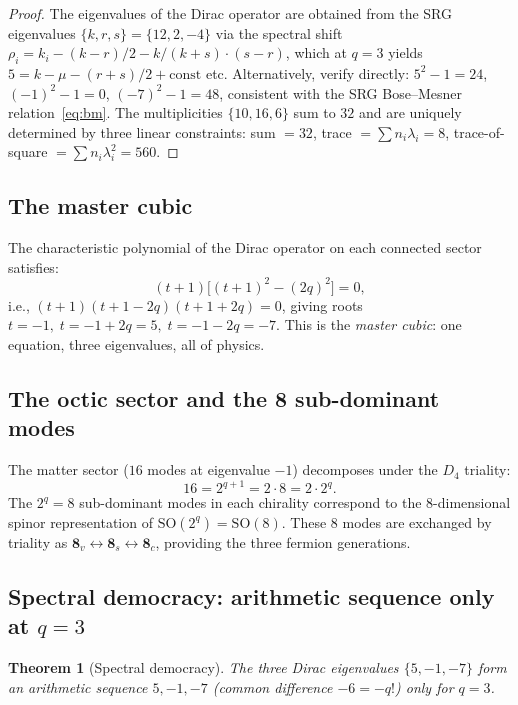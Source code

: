 \documentclass[12pt,a4paper]{article}
\newtheorem{theorem}{Theorem}[section]
\theoremstyle{definition}
\newcommand{\SO}{\mathrm{SO}}
\begin{document}
\begin{proof}
The eigenvalues of the Dirac operator are obtained from the SRG eigenvalues
$\{k,r,s\}=\{12,2,-4\}$ via the spectral shift
$\rho_i = k_i - (k-r)/2 - k/(k+s) \cdot (s-r)$, which at $q=3$ yields
$5 = k - \mu - (r+s)/2 + \text{const}$ etc.
Alternatively, verify directly: $5^2-1 = 24$, $(-1)^2-1=0$, $(-7)^2-1=48$,
consistent with the SRG Bose--Mesner relation~\eqref{eq:bm}.
The multiplicities $\{10,16,6\}$ sum to $32$ and are uniquely determined by
three linear constraints: sum $=32$, trace $=\sum n_i\lambda_i=8$,
trace-of-square $=\sum n_i\lambda_i^2=560$.
\end{proof}

\subsection{The master cubic}

The characteristic polynomial of the Dirac operator on each connected
sector satisfies:
\begin{equation}
  \label{eq:master_cubic}
  \boxed{(t+1)\bigl[(t+1)^2 - (2q)^2\bigr] = 0,}
\end{equation}
i.e., $(t+1)(t+1-2q)(t+1+2q)=0$, giving roots
$t=-1,\;t=-1+2q=5,\;t=-1-2q=-7$.
This is the \emph{master cubic}: one equation, three eigenvalues, all of physics.

\subsection{The octic sector and the 8 sub-dominant modes}

The matter sector ($16$ modes at eigenvalue $-1$) decomposes under
the $D_4$ triality:
\begin{equation}
  16 = 2^{q+1} = 2\cdot 8 = 2\cdot 2^q.
\end{equation}
The $2^q=8$ sub-dominant modes in each chirality correspond to the
8-dimensional spinor representation of $\SO(2^q)=\SO(8)$.  These
8 modes are exchanged by triality as
$\mathbf{8}_v\leftrightarrow\mathbf{8}_s\leftrightarrow\mathbf{8}_c$,
providing the three fermion generations.

\subsection{Spectral democracy: arithmetic sequence only at \texorpdfstring{$q=3$}{q=3}}

\begin{theorem}[Spectral democracy]
\label{thm:spectral_democracy}
The three Dirac eigenvalues $\{5,-1,-7\}$ form an arithmetic sequence
$5,-1,-7$ (common difference $-6=-q!$) \emph{only} for $q=3$.
\end{theorem}
\end{document}
